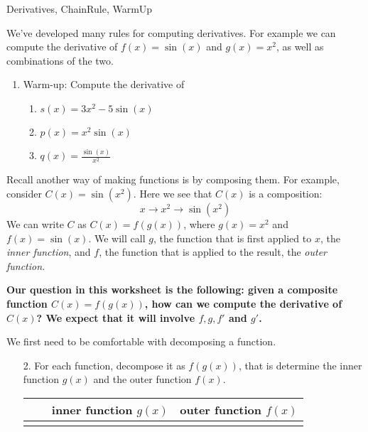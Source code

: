 \begin{tagblock}{Derivatives, ChainRule, WarmUp}
\begin{question}
	






We've developed many rules for computing derivatives.  For example we can compute the derivative of $f(x)=\sin(x)$ and $g(x) = x^2$, as well as combinations of the two.

\begin{enumerate}
\item Warm-up: Compute the derivative of 
\begin{enumerate}
\item $s(x) = 3x^2 - 5\sin(x)$
\vspace{.5in}

\item $p(x) = x^2\sin(x)$
\vspace{.75in}
\item $\displaystyle q(x) = \frac{\sin(x)}{x^2}$
\end{enumerate}
\vspace{.75in}
\end{enumerate}

Recall another way of making functions is by composing them.  For example, consider $C(x) = \sin(x^2)$.  Here we see that $C(x)$ is a composition:
\[x \to x^2 \to \sin(x^2) \]
We can write $C$ as $C(x) = f(g(x))$, where $g(x) = x^2$ and $f(x) = \sin(x)$.  We will call  $g$, the function that is first applied to $x$,  the \emph{inner function}, and $f$, the function that is applied to the result, the \emph{outer function.}

\smallskip
\textbf{Our question in this worksheet is the following: given a composite function $C(x)=f(g(x))$, how can we compute the derivative of $C(x)$?  We expect that it will involve $f, g, f'$ and $g'$. }

\bigskip

 We first need to be comfortable with decomposing a function.
\begin{enumerate}
\item[2.] For each function, decompose it as $f(g(x))$, that is determine the inner function $g(x)$ and the outer function $f(x)$.

\begin{tabular}{|l l | c| c| } \hline
& &  inner function $g(x)$ \hspace{.2in} & outer function $f(x)$ \hspace{.2in} \\ \hline
&&&\\


\end{tabular}
\end{enumerate}
\end{question}
\end{tagblock}

